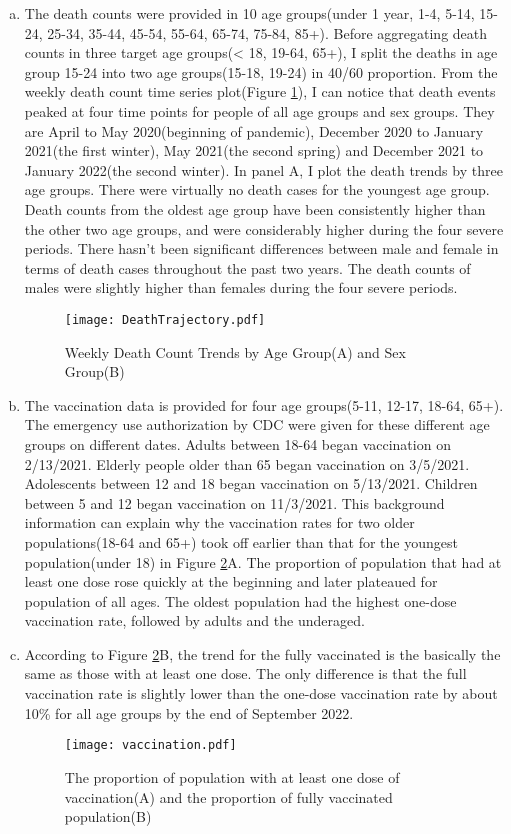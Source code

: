 \documentclass[12pt]{article}
\begin{document}
\begin{enumerate}[(a)]
	\item  The death counts were provided in 10 age groups(under 1 year, 1-4, 5-14, 15-24, 25-34, 35-44, 45-54, 55-64, 65-74, 75-84, 85+). Before aggregating death counts in three target age groups(< 18, 19-64, 65+), I split the deaths in age group 15-24 into two age groups(15-18, 19-24) in 40/60 proportion. From the weekly death count time series plot(Figure \ref{weekdeath}), I can notice that death events peaked at four time points for people of all age groups and sex groups. They are April to May 2020(beginning of pandemic), December 2020 to January 2021(the first winter), May 2021(the second spring) and December 2021 to January 2022(the second winter). In panel A, I plot the death trends by three age groups. There were virtually no death cases for the youngest age group. Death counts from the oldest age group have been consistently higher than the other two age groups, and were considerably higher during the four severe periods. There hasn't been significant differences between male and female in terms of death cases throughout the past two years. The death counts of males were slightly higher than females during the four severe periods.
	\begin{figure}[htbp]
		\centering
		\texttt{[image: DeathTrajectory.pdf]}
		\caption{Weekly Death Count Trends by Age Group(A) and Sex Group(B)}\label{weekdeath}
	\end{figure} 
	
	\item The vaccination data is provided for four age groups(5-11, 12-17, 18-64, 65+). The emergency use authorization by CDC were given for these different age groups on different dates. Adults between 18-64 began vaccination on 2/13/2021. Elderly people older than 65 began vaccination on 3/5/2021. Adolescents between 12 and 18 began vaccination on 5/13/2021. Children between 5 and 12 began vaccination on 11/3/2021. This background information can explain why the vaccination rates for two older populations(18-64 and 65+) took off earlier than that for the youngest population(under 18) in Figure \ref{vaccinationplot}A. The proportion of population that had at least one dose rose quickly at the beginning and later plateaued for population of all ages. The oldest population had the highest one-dose vaccination rate, followed by adults and the underaged.
	
	\item According to Figure \ref{vaccinationplot}B, the trend for the fully vaccinated is the basically the same as those with at least one dose. The only difference is that the full vaccination rate is slightly lower than the one-dose vaccination rate by about 10\% for all age groups by the end of September 2022.
	
	\begin{figure}[htbp]
		\centering
		\texttt{[image: vaccination.pdf]}
		\caption{The proportion of population with at least one dose of vaccination(A) and the proportion of fully vaccinated population(B)}\label{vaccinationplot}
	\end{figure}
\end{enumerate}
\end{document}
